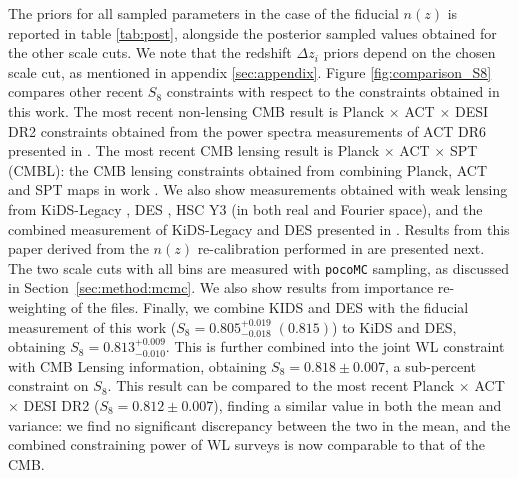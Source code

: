 The priors for all sampled parameters in the case of the fiducial $n(z)$ is reported in table \ref{tab:post}, alongside the posterior sampled values obtained for the other scale cuts. We note that the redshift $\Delta z_i$ priors depend on the chosen scale cut, as mentioned in appendix \ref{sec:appendix}.
Figure \ref{fig:comparison_S8} compares other recent $S_8$ constraints with respect to the constraints obtained in this work.  The most recent non-lensing CMB result is Planck $\times$ ACT $\times$ DESI DR2 constraints obtained from the power spectra measurements of ACT DR6 presented in \cite{Louis2025_ACTDR6_PS_S8}. The 
most recent CMB lensing result is Planck $\times$ ACT $\times$ SPT (CMBL): the CMB lensing constraints obtained from combining Planck, ACT and SPT maps in work \cite{Qu2025_ACTSPTPLANCK_CMBL_S8}.
We also show measurements obtained with weak lensing from KiDS-Legacy \cite{Wright2025_KiDSLegacy}, DES \cite{Amon2022CosmoShearDES, Secco2022CosmoShearDES}, HSC Y3 (in both real \cite{Li2023_HSCY3_CosmicShear} and Fourier \cite{Dalal2023CosmoShearHSC} space), and the combined measurement of KiDS-Legacy and DES presented in \cite{Wright2025_KiDSLegacy}. Results from this paper derived from the $n(z)$ re-calibration performed in \cite{ChoppinDeJanvry2025a} are presented next. The two scale cuts with all bins are measured with \texttt{pocoMC} sampling, as discussed in Section~\ref{sec:method:mcmc}. We also show results from importance re-weighting of the files. Finally, we combine KIDS and DES with the fiducial measurement of this work ($S_8=0.805^{+0.019}_{-0.018}\;(0.815)$) to KiDS and DES, obtaining $S_8=0.813^{+0.009}_{-0.010}$. This is further combined into the joint WL constraint with CMB Lensing information, obtaining $S_8=0.818\pm0.007$, a sub-percent constraint on $S_8$. This result can be compared to the most recent Planck $\times$ ACT $\times$ DESI DR2 ($S_8=0.812\pm0.007$), finding a similar value in both the mean and variance: we find no significant discrepancy between the two in the mean, and the combined constraining power of WL surveys is now comparable to that of the CMB.
